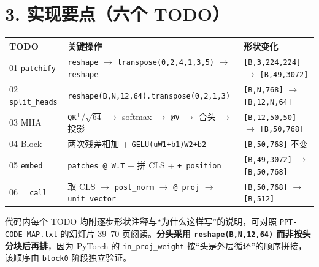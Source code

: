 \documentclass[11pt,a4paper]{article}
\newcommand{\hl}[1]{\textcolor{red!85!black}{\textbf{#1}}}
\newcommand{\code}[1]{\texttt{\small #1}}
\begin{document}
\section*{3. 实现要点（六个 TODO）}
\begin{table}[h!]
\centering\small
\begin{tabular}{@{}l l l@{}}
\toprule
TODO & 关键操作 & 形状变化\\
\midrule
01 \code{patchify} & \code{reshape} $\to$ \code{transpose(0,2,4,1,3,5)} $\to$ \code{reshape} & \code{[B,3,224,224]} $\to$ \code{[B,49,3072]}\\
02 \code{split\_heads} & \code{reshape(B,N,12,64).transpose(0,2,1,3)} & \code{[B,N,768]} $\to$ \code{[B,12,N,64]}\\
03 MHA & \code{QK$^\mathsf{T}/\sqrt{64}$} $\to$ softmax $\to$ \code{@V} $\to$ 合头 $\to$ 投影 & \code{[B,12,50,50]} $\to$ \code{[B,50,768]}\\
04 Block & 两次残差相加 + \code{GELU(uW1+b1)W2+b2} & \code{[B,50,768]} 不变\\
05 \code{embed} & \code{patches @ W.T} + 拼 CLS + \code{+ position} & \code{[B,49,3072]} $\to$ \code{[B,50,768]}\\
06 \code{\_\_call\_\_} & 取 CLS $\to$ \code{post\_norm} $\to$ \code{@ proj} $\to$ \code{unit\_vector} & \code{[B,50,768]} $\to$ \code{[B,512]}\\
\bottomrule
\end{tabular}
\end{table}
代码内每个 TODO 均附逐步形状注释与``为什么这样写''的说明，可对照 \code{PPT-CODE-MAP.txt} 的幻灯片 39--70 页阅读。\hl{分头采用 \code{reshape(B,N,12,64)} 而非按头分块后再排}，因为 PyTorch 的 \code{in\_proj\_weight} 按``头是外层循环''的顺序拼接，该顺序由 \code{block0} 阶段独立验证。
\end{document}
